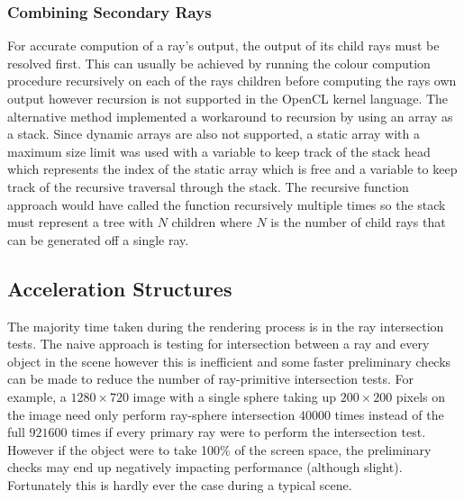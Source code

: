 \documentclass[final]{cmpreport}
\begin{document}
\subsubsection{Combining Secondary Rays}

For accurate compution of a ray's output, the output of its child rays must be resolved first. This can usually be achieved by running the colour compution procedure recursively on each of the rays children before computing the rays own output however recursion is not supported in the OpenCL kernel language. The alternative method implemented a workaround to recursion by using an array as a stack. Since dynamic arrays are also not supported, a static array with a maximum size limit was used with a variable to keep track of the stack head which represents the index of the static array which is free and a variable to keep track of the recursive traversal through the stack. The recursive function approach would have called the function recursively multiple times so the stack must represent a tree with $N$ children where $N$ is the number of child rays that can be generated off a single ray.

\subsection{Acceleration Structures}

The majority time taken during the rendering process is in the ray intersection tests. The naive approach is testing for intersection between a ray and every object in the scene however this is inefficient and some faster preliminary checks can be made to reduce the number of ray-primitive intersection tests. For example, a $1280 \times 720$ image with a single sphere taking up $200 \times 200$ pixels on the image need only perform ray-sphere intersection $40000$ times instead of the full $921600$ times if every primary ray were to perform the intersection test. However if the object were to take 100\% of the screen space, the preliminary checks may end up negatively impacting performance (although slight). Fortunately this is hardly ever the case during a typical scene.
\end{document}
